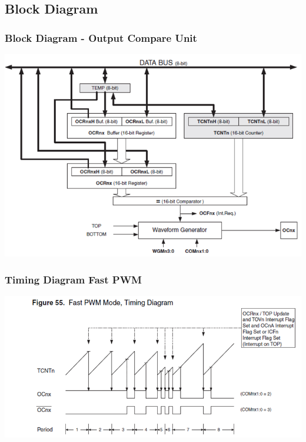 \documentclass[10pt,red]{beamer}
\begin{document}
\subsection{Block Diagram}
\begin{frame}
		\frametitle{Block Diagram - Output Compare Unit} \pause
			\includegraphics[width = \linewidth]{block_diagram_output_compare_unit} 	
\end{frame}

\begin{frame}
		\frametitle{Timing Diagram Fast PWM} \pause
			\includegraphics[width = \linewidth]{Timing_diagram_fast_PWM} 	
\end{frame}
\end{document}
